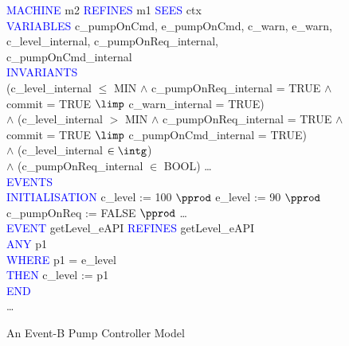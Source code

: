 \begin{figure}[h]
\centering
\begin{minipage}{0.8\textwidth}
\textcolor{blue}{MACHINE} m2 \textcolor{blue}{REFINES} m1 \textcolor{blue}{SEES} ctx \\
\textcolor{blue}{VARIABLES}  \hspace*{0.2cm} c\_pumpOnCmd, e\_pumpOnCmd, c\_warn, e\_warn,\\
\hspace*{0.2cm} c\_level\_internal, c\_pumpOnReq\_internal, c\_pumpOnCmd\_internal\\
\textcolor{blue}{INVARIANTS}\\
\hspace*{0.2cm}(c\_level\_internal $\leq$ MIN $\land$ c\_pumpOnReq\_internal = TRUE $\land$\\
\hspace*{0.5cm} commit = TRUE $\limp$ c\_warn\_internal = TRUE)\\
\hspace*{0.2cm} $\land$ (c\_level\_internal $>$  MIN $\land$  c\_pumpOnReq\_internal = TRUE $\land$\\
\hspace*{0.5cm} commit = TRUE $\limp$  c\_pumpOnCmd\_internal = TRUE)\\
\hspace*{0.2cm} $\land$ (c\_level\_internal $\in  \intg$)\\
\hspace*{0.2cm} $\land$ (c\_pumpOnReq\_internal $\in$  BOOL) \ldots\\
\textcolor{blue}{EVENTS}\\
\textcolor{blue}{INITIALISATION} c\_level :=  100 $\pprod$ e\_level := 90 $\pprod$ c\_pumpOnReq :=  FALSE $\pprod$ \ldots\\
\textcolor{blue}{EVENT} getLevel\_eAPI \textcolor{blue}{REFINES} getLevel\_eAPI\\
\hspace*{0.2cm}\textcolor{blue}{ANY} p1\\
\hspace*{0.2cm}\textcolor{blue}{WHERE} p1 = e\_level  \\
\hspace*{0.2cm}\textcolor{blue}{THEN} c\_level :=  p1\\
\hspace*{0.2cm}\textcolor{blue}{END}\\
\ldots
\end{minipage}
\caption{An Event-B  Pump Controller Model}
\label{fig:controllerSpec2}
\end{figure}
